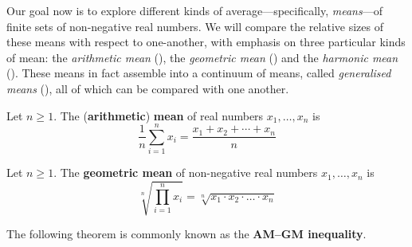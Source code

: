 Our goal now is to explore different kinds of average---specifically, \textit{means}---of finite sets of non-negative real numbers. We will compare the relative sizes of these means with respect to one-another, with emphasis on three particular kinds of mean: the \textit{arithmetic mean} (), the \textit{geometric mean} () and the \textit{harmonic mean} (). These means in fact assemble into a continuum of means, called \textit{generalised means} (), all of which can be compared with one another.

\begin{definition}
\label{defArithmeticMean}
Let $n \ge 1$. The (\textbf{arithmetic}) \textbf{mean} of real numbers $x_1,\dots,x_n$ is
\[ \frac{1}{n} \sum_{i=1}^n x_i = \frac{x_1 + x_2 + \cdots + x_n}{n} \]
\end{definition}

\begin{definition}
\label{defGeometricMean}
Let $n \ge 1$. The \textbf{geometric mean} of non-negative real numbers $x_1,\dots,x_n$ is
\[ \sqrt[n]{\prod_{i=1}^n x_i} = \sqrt[n]{x_1 \cdot x_2 \cdot \dots \cdot x_n} \]
\end{definition}

The following theorem is commonly known as the \textbf{AM--GM inequality}.

